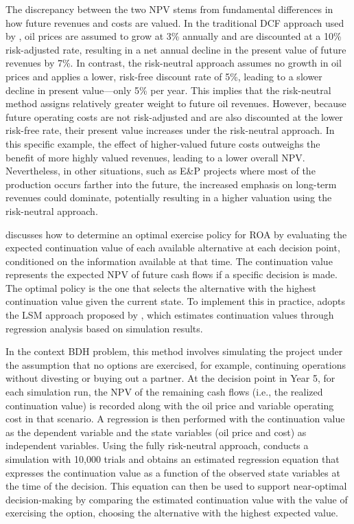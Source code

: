 \documentclass[pdflatex,sn-basic]{sn-jnl}%
\theoremstyle{thmstyleone}%
\theoremstyle{thmstyletwo}%
\theoremstyle{thmstylethree}%
\begin{document}
The discrepancy between the two NPV stems from fundamental differences in how future revenues and costs are valued. In the traditional DCF approach used by \cite{ref12}, oil prices are assumed to grow at 3\% annually and are discounted at a 10\% risk-adjusted rate, resulting in a net annual decline in the present value of future revenues by 7\%. In contrast, the risk-neutral approach assumes no growth in oil prices and applies a lower, risk-free discount rate of 5\%, leading to a slower decline in present value—only 5\% per year. This implies that the risk-neutral method assigns relatively greater weight to future oil revenues. However, because future operating costs are not risk-adjusted and are also discounted at the lower risk-free rate, their present value increases under the risk-neutral approach. In this specific example, the effect of higher-valued future costs outweighs the benefit of more highly valued revenues, leading to a lower overall NPV. Nevertheless, in other situations, such as E\&P projects where most of the production occurs farther into the future, the increased emphasis on long-term revenues could dominate, potentially resulting in a higher valuation using the risk-neutral approach.

\cite{ref13} discusses how to determine an optimal exercise policy for ROA by evaluating the expected continuation value of each available alternative at each decision point, conditioned on the information available at that time. The continuation value represents the expected NPV of future cash flows if a specific decision is made. The optimal policy is the one that selects the alternative with the highest continuation value given the current state. To implement this in practice, \cite{ref13} adopts the LSM approach proposed by \cite{ref14}, which estimates continuation values through regression analysis based on simulation results.

In the context BDH problem, this method involves simulating the project under the assumption that no options are exercised, for example, continuing operations without divesting or buying out a partner. At the decision point in Year 5, for each simulation run, the NPV of the remaining cash flows (i.e., the realized continuation value) is recorded along with the oil price and variable operating cost in that scenario. A regression is then performed with the continuation value as the dependent variable and the state variables (oil price and cost) as independent variables. Using the fully risk-neutral approach, \cite{ref13} conducts a simulation with 10,000 trials and obtains an estimated regression equation that expresses the continuation value as a function of the observed state variables at the time of the decision. This equation can then be used to support near-optimal decision-making by comparing the estimated continuation value with the value of exercising the option, choosing the alternative with the highest expected value.
\end{document}
